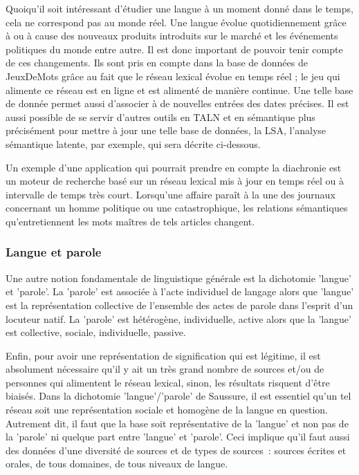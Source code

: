 \documentclass[a4paper,11pt,french]{article}
\begin{document}
Quoiqu'il soit intéressant d'étudier une langue à un moment donné dans le temps, cela ne correspond pas au monde réel. Une langue évolue quotidiennement grâce à ou à cause des nouveaux produits introduits sur le marché et les événements politiques du monde entre autre. Il est donc important de pouvoir tenir compte de ces changements. Ils sont pris en compte dans la base de données de JeuxDeMots grâce au fait que le réseau lexical évolue en temps réel ; le jeu qui alimente ce réseau est en ligne et est alimenté de manière continue. Une telle base de donnée permet aussi d'associer à de nouvelles entrées des dates précises. Il est aussi possible de se servir d'autres outils en TALN et en sémantique plus précisément pour mettre à jour une telle base de données, la LSA, l'analyse sémantique latente, par exemple, qui sera décrite ci-dessous.

Un exemple d'une application qui pourrait prendre en compte la diachronie est un moteur de recherche basé sur un réseau lexical mis à jour en temps réel ou à intervalle de temps très court. Lorsqu'une affaire paraît à la une des journaux concernant un homme politique ou une catastrophique, les relations sémantiques qu'entretiennent les mots maîtres de tels articles changent.

\subsubsection{Langue et parole}

Une autre notion fondamentale de linguistique générale est la dichotomie 'langue' et 'parole'. La 'parole' est associée à l'acte individuel de langage alors que 'langue' est la représentation collective de l'ensemble des actes de parole dans l'esprit d'un locuteur natif. La 'parole' est hétérogène, individuelle, active alors que la 'langue' est collective, sociale, individuelle, passive. 

Enfin, pour avoir une représentation de signification qui est légitime, il est absolument nécessaire qu'il y ait un très grand nombre de sources et/ou de personnes qui alimentent le réseau lexical, sinon, les résultats risquent d'être biaisés. Dans la dichotomie 'langue'/'parole' de Saussure, il est essentiel qu'un tel réseau soit une représentation sociale et homogène de la langue en question. Autrement dit, il faut que la base soit représentative de la 'langue' et non pas de la 'parole' ni quelque part entre 'langue' et 'parole'. Ceci implique qu'il faut aussi des données d'une diversité de sources et de types de sources~: sources écrites et orales, de tous domaines, de tous niveaux de langue. 
\end{document}
